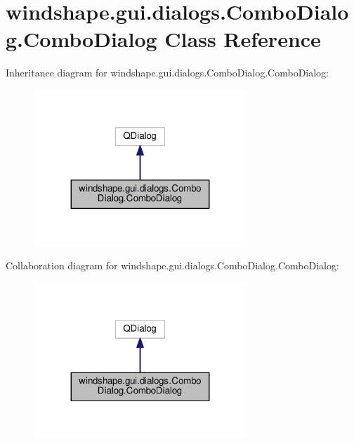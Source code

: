 \hypertarget{classwindshape_1_1gui_1_1dialogs_1_1_combo_dialog_1_1_combo_dialog}{}\section{windshape.\+gui.\+dialogs.\+Combo\+Dialog.\+Combo\+Dialog Class Reference}
\label{classwindshape_1_1gui_1_1dialogs_1_1_combo_dialog_1_1_combo_dialog}


Inheritance diagram for windshape.\+gui.\+dialogs.\+Combo\+Dialog.\+Combo\+Dialog\+:\nopagebreak
\begin{figure}[H]
\begin{center}
\leavevmode
\includegraphics[width=227pt]{classwindshape_1_1gui_1_1dialogs_1_1_combo_dialog_1_1_combo_dialog__inherit__graph}
\end{center}
\end{figure}


Collaboration diagram for windshape.\+gui.\+dialogs.\+Combo\+Dialog.\+Combo\+Dialog\+:\nopagebreak
\begin{figure}[H]
\begin{center}
\leavevmode
\includegraphics[width=227pt]{classwindshape_1_1gui_1_1dialogs_1_1_combo_dialog_1_1_combo_dialog__coll__graph}
\end{center}
\end{figure}
